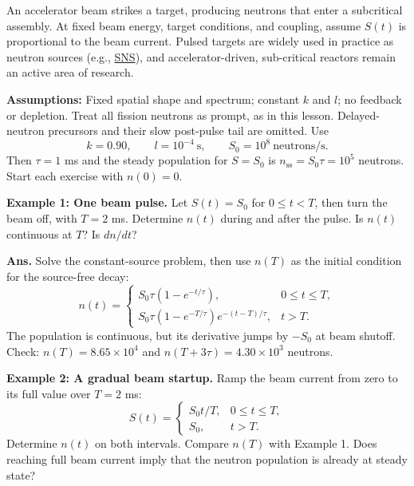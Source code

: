 \documentclass[compact]{ne630handout}
\begin{document}
\begin{handoutflow}
An accelerator beam strikes a target, producing neutrons that enter a
subcritical assembly. At fixed beam energy, target conditions, and coupling,
assume $S(t)$ is proportional to the beam current. Pulsed targets are widely used
in practice as neutron sources (e.g., \href{https://neutrons-user-facilities.ornl.gov/how-sns-works/}{SNS}), and accelerator-driven, sub-critical reactors
remain an active area of research.

\vspace{5pt}

\textbf{Assumptions:} Fixed spatial shape and spectrum; constant $k$ and $l$;
no feedback or depletion. Treat all fission neutrons as prompt, as in this
lesson. Delayed-neutron precursors and their slow post-pulse tail are omitted.
Use
\[
 k=0.90,\qquad l=10^{-4}\ \mathrm{s},\qquad
 S_0=10^8\ \text{neutrons/s}.
\]
Then $\tau=1$ ms and the steady population for $S=S_0$ is
$n_{\mathrm{ss}}=S_0\tau=10^5$ neutrons. Start each exercise with $n(0)=0$.

\columnbreak


\textbf{Example 1: One beam pulse.} Let $S(t)=S_0$ for $0\leq t<T$,
then turn the beam off, with $T=2$ ms. Determine $n(t)$ during and after
the pulse. Is $n(t)$ continuous at $T$? Is $dn/dt$?

\vspace{5pt}

{\color{wcprimary}\small
\textbf{Ans.} Solve the constant-source problem, then use $n(T)$ as the
initial condition for the source-free decay:
\[
 n(t)=
 \begin{cases}
 S_0\tau(1-e^{-t/\tau}), & 0\leq t\leq T,\\[3pt]
 S_0\tau(1-e^{-T/\tau})e^{-(t-T)/\tau}, & t>T.
 \end{cases}
\]
The population is continuous, but its derivative jumps by $-S_0$ at beam
shutoff. Check: $n(T)=8.65\times10^4$ and
$n(T+3\tau)=4.30\times10^3$ neutrons.\par}


\vfill
\textbf{Example 2: A gradual beam startup.} Ramp the beam current from zero
to its full value over $T=2$ ms:
\[
 S(t)=
 \begin{cases}
 S_0t/T, & 0\leq t\leq T,\\
 S_0, & t>T.
 \end{cases}
\]
Determine $n(t)$ on both intervals. Compare $n(T)$ with Example 1.
Does reaching full beam current imply that the neutron population is
already at steady state?


\end{handoutflow}
\end{document}
